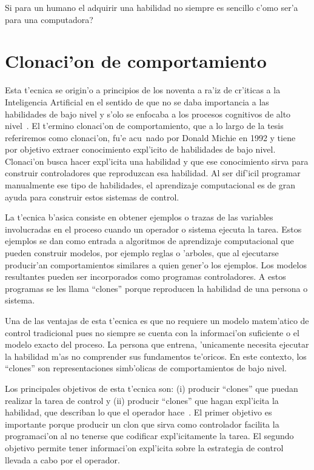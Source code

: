 \documentclass[11pt]{article}
\begin{document}
Si para un humano el adquirir una habilidad no siempre es sencillo \textquestiondown c'omo ser'a para una computadora?

\section {Clonaci'on de comportamiento}

Esta t'ecnica se origin'o a principios de los noventa a ra'iz de cr'iticas a la Inteligencia Artificial en el sentido de que no se daba importancia a las habilidades de bajo nivel y s'olo se enfocaba a los procesos cognitivos de alto nivel~\cite{michiesammut:cloning}. El t'ermino \textsf{clonaci'on de comportamiento}, que a lo largo de la tesis referiremos como \textsf{clonaci'on}, fu'e acu~nado por Donald Michie en 1992 y tiene por objetivo extraer conocimiento expl'icito de habilidades de bajo nivel. \textsf{Clonaci'on} busca hacer expl'icita una habilidad y que ese conocimiento sirva para construir controladores que reproduzcan esa habilidad. Al ser dif'icil programar manualmente ese tipo de habilidades, el aprendizaje computacional es de gran ayuda para construir estos sistemas de control.

La t'ecnica b'asica consiste en obtener ejemplos o trazas de las variables involucradas en el proceso cuando un operador o sistema ejecuta la tarea. Estos ejemplos se dan como entrada a algoritmos de aprendizaje computacional que pueden construir modelos, por ejemplo reglas o 'arboles, que al ejecutarse producir'an comportamientos similares a quien gener'o los ejemplos. Los modelos resultantes pueden ser incorporados como programas controladores. A estos programas se les llama ``clones'' porque reproducen la habilidad de una persona o sistema.

Una de las ventajas de esta t'ecnica es que no requiere un modelo matem'atico de control tradicional pues no siempre se cuenta con la informaci'on suficiente o el modelo exacto del proceso. La persona que entrena, 'unicamente necesita ejecutar la habilidad m'as no comprender sus fundamentos te'oricos. En este contexto, los ``clones'' son representaciones simb'olicas de comportamientos de bajo nivel. 

Los principales objetivos de esta t'ecnica son: (i) producir ``clones'' que puedan realizar la tarea de control y (ii) producir ``clones'' que hagan expl'icita la habilidad, que describan lo que el operador hace~\cite{modellingskills}. El primer objetivo es importante porque producir un clon que sirva como controlador facilita la programaci'on al no tenerse que codificar expl'icitamente la tarea. El segundo objetivo permite tener informaci'on expl'icita sobre la estrategia de control llevada a cabo por el operador. 
\end{document}
